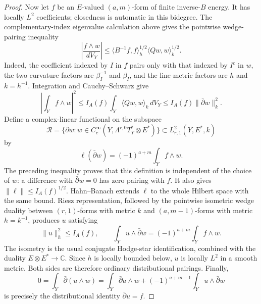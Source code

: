 \documentclass[11pt,reqno]{amsart}
\numberwithin{equation}{section}
\theoremstyle{definition}
\theoremstyle{remark}
\begin{document}
\begin{proof}
Now let $f$ be an $E$-valued $(a,m)$-form of finite inverse-$B$
energy.  It has locally $L^2$ coefficients; closedness is automatic
in this bidegree.  The complementary-index eigenvalue calculation
above gives the pointwise wedge-pairing inequality
\[
 \left|\frac{f\wedge w}{dV_Y}\right|
 \le\langle B^{-1}f,f\rangle_h^{1/2}
             \langle Qw,w\rangle_k^{1/2}.
\]
Indeed, the coefficient indexed by $I$ in $f$ pairs only with that
indexed by $I^c$ in $w$, the two curvature factors are
$\beta_I^{-1}$ and $\beta_I$, and the line-metric factors are
$h$ and $k=h^{-1}$.  Integration and Cauchy--Schwarz give
\[
 \left|\int_Yf\wedge w\right|^2
 \le I_A(f)\int_Y\langle Qw,w\rangle_k\,dV_Y
 \le I_A(f)\|\bar\partial w\|_k^2.
\]
Define a complex-linear functional on the subspace
\[
 \mathcal R=\{\bar\partial w:
  w\in C_c^\infty(Y,\Lambda^{r,0}T_Y^*\otimes E^*)\}
 \subset L^2_{r,1}(Y,E^*,k)
\]
by
\[
 \ell(\bar\partial w)=(-1)^{a+m}\int_Yf\wedge w.
\]
The preceding inequality proves that this definition is independent
of the choice of $w$: a difference with $\bar\partial w=0$ has zero
pairing with $f$.  It also gives $\|\ell\|\le I_A(f)^{1/2}$.
Hahn--Banach extends $\ell$ to the whole Hilbert space with the same
bound.  Riesz representation, followed by the pointwise isometric
wedge duality between $(r,1)$-forms with metric $k$ and
$(a,m-1)$-forms with metric $h=k^{-1}$, produces $u$ satisfying
\[
 \|u\|_h^2\le I_A(f),\qquad
 \int_Yu\wedge\bar\partial w
       =(-1)^{a+m}\int_Yf\wedge w.
\]
The isometry is the usual conjugate Hodge-star identification,
combined with the duality $E\otimes E^*\to\mathbb C$.
Since $h$ is locally bounded below,
$u$ is locally $L^2$ in a smooth metric.  Both sides are therefore
ordinary distributional pairings.  Finally,
\[
 0=\int_Y\bar\partial(u\wedge w)
   =\int_Y\bar\partial u\wedge w
       +(-1)^{a+m-1}\int_Yu\wedge\bar\partial w
\]
is precisely the distributional identity $\bar\partial u=f$.
\end{proof}
\end{document}
